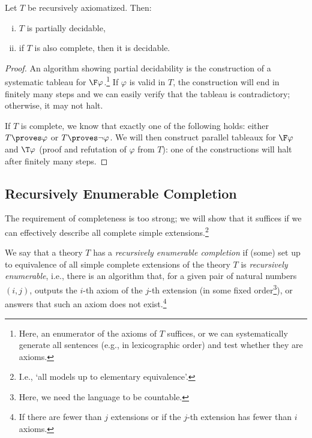 \begin{proposition}
    Let $T$ be recursively axiomatized. Then:
    \begin{enumerate}[(i)]
        \item $T$ is partially decidable,
        \item if $T$ is also complete, then it is decidable.
    \end{enumerate}
\end{proposition}
\begin{proof}
An algorithm showing partial decidability is the construction of a systematic tableau for $\F \varphi$.\footnote{Here, an enumerator of the axioms of $T$ suffices, or we can systematically generate all sentences (e.g., in lexicographic order) and test whether they are axioms.} If $\varphi$ is valid in $T$, the construction will end in finitely many steps and we can easily verify that the tableau is contradictory; otherwise, it may not halt.

If $T$ is complete, we know that exactly one of the following holds: either $T \proves \varphi$ or $T \proves \neg \varphi$. We will then construct parallel tableaux for $\F \varphi$ and $\T \varphi$ (proof and refutation of $\varphi$ from $T$): one of the constructions will halt after finitely many steps.
\end{proof}


\subsection{Recursively Enumerable Completion}

The requirement of completeness is too strong; we will show that it suffices if we can effectively describe all complete simple extensions.\footnote{I.e., `all models up to elementary equivalence'.}

\begin{definition}
We say that a theory $T$ has a \emph{recursively enumerable completion} if (some) set up to equivalence of all simple complete extensions of the theory $T$ is \emph{recursively enumerable}, i.e., there is an algorithm that, for a given pair of natural numbers $(i,j)$, outputs the $i$-th axiom of the $j$-th extension (in some fixed order\footnote{Here, we need the language to be countable.}), or answers that such an axiom does not exist.\footnote{If there are fewer than $j$ extensions or if the $j$-th extension has fewer than $i$ axioms.}
\end{definition}

